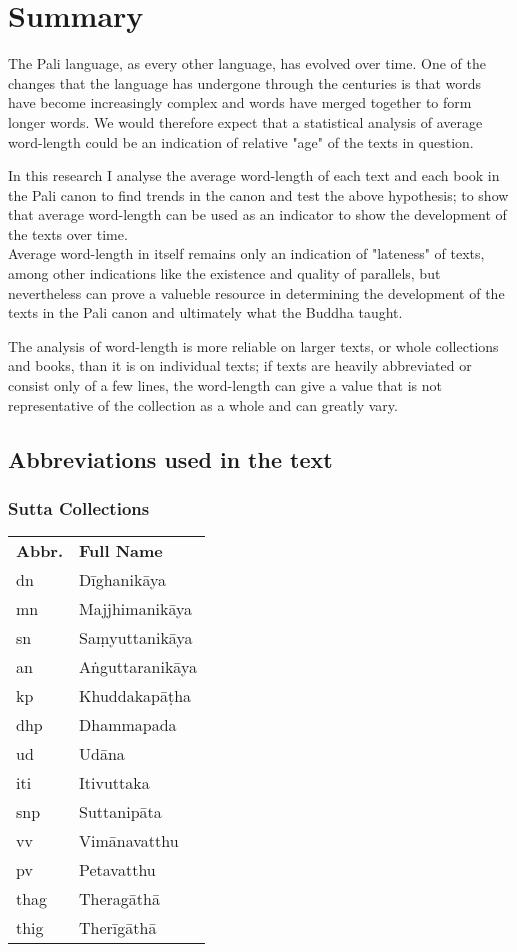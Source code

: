 \section{Summary}
The Pali language, as every other language, has evolved over time. One of the changes that the language has undergone through the centuries is that words have become increasingly complex and words have merged together to form longer words. We would therefore expect that a statistical analysis of average word-length could be an indication of relative "age" of the texts in question. 

In this research I analyse the average word-length of each text and each book in the Pali canon to find trends in the canon and test the above hypothesis; to show that average word-length can be used as an indicator to show the development of the texts over time.\\

Average word-length in itself remains only an indication of "lateness" of texts, among other indications like the existence and quality of parallels, but nevertheless can prove a valueble resource in determining the development of the texts in the Pali canon and ultimately what the Buddha taught.

The analysis of word-length is more reliable on larger texts, or whole collections and books, than it is on individual texts; if texts are heavily abbreviated or consist only of a few lines, the word-length can give a value that is not representative of the collection as a whole and can greatly vary.

\medskip
\subsection{Abbreviations used in the text}

\subsubsection{Sutta Collections}

\small
\begin{tabular}{ l l }
\textbf{Abbr.} & \textbf{Full Name} \\
dn & Dīghanikāya \\
mn & Majjhimanikāya \\
sn & Saṃyuttanikāya \\
an & Aṅguttaranikāya \\
kp & Khuddakapāṭha \\
dhp & Dhammapada \\
ud & Udāna \\
iti & Itivuttaka \\
snp & Suttanipāta \\
vv & Vimānavatthu \\
pv & Petavatthu \\
thag & Theragāthā \\
thig & Therīgāthā
\end{tabular}

